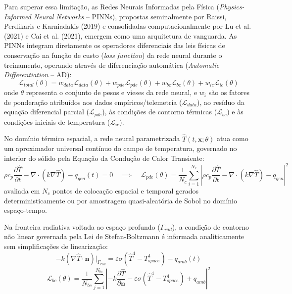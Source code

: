 Para superar essa limitação, as Redes Neurais Informadas pela Física (\textit{Physics-Informed Neural Networks} -- PINNs), propostas seminalmente por Raissi, Perdikaris e Karniadakis (2019) e consolidadas computacionalmente por Lu et al. (2021) e Cai et al. (2021), emergem como uma arquitetura de vanguarda. As PINNs integram diretamente os operadores diferenciais das leis físicas de conservação na função de custo (\textit{loss function}) da rede neural durante o treinamento, operando através de diferenciação automática (\textit{Automatic Differentiation} -- AD):
\begin{equation}
    \mathcal{L}_{total}(\theta) = w_{data}\mathcal{L}_{data}(\theta) + w_{pde}\mathcal{L}_{pde}(\theta) + w_{bc}\mathcal{L}_{bc}(\theta) + w_{ic}\mathcal{L}_{ic}(\theta)
    \label{eq:pinn_loss_geral}
\end{equation}
onde $\theta$ representa o conjunto de pesos e vieses da rede neural, e $w_i$ são os fatores de ponderação atribuídos aos dados empíricos/telemetria ($\mathcal{L}_{data}$), ao resíduo da equação diferencial parcial ($\mathcal{L}_{pde}$), às condições de contorno térmicas ($\mathcal{L}_{bc}$) e às condições iniciais de temperatura ($\mathcal{L}_{ic}$).

No domínio térmico espacial, a rede neural parametrizada $\hat{T}(t, \mathbf{x}; \theta)$ atua como um aproximador universal contínuo do campo de temperatura, governado no interior do sólido pela Equação da Condução de Calor Transiente:
\begin{equation}
    \rho c_p \frac{\partial \hat{T}}{\partial t} - \nabla \cdot \left( k \nabla \hat{T} \right) - q_{gen}(t) = 0 \quad \implies \quad \mathcal{L}_{pde}(\theta) = \frac{1}{N_{c}} \sum_{i=1}^{N_{c}} \left| \rho c_p \frac{\partial \hat{T}}{\partial t} - \nabla \cdot (k \nabla \hat{T}) - q_{gen} \right|^2
    \label{eq:pde_calor_pinn}
\end{equation}
avaliada em $N_c$ pontos de colocação espacial e temporal gerados deterministicamente ou por amostragem quasi-aleatória de Sobol no domínio espaço-tempo.

Na fronteira radiativa voltada ao espaço profundo ($\Gamma_{rad}$), a condição de contorno não linear governada pela Lei de Stefan-Boltzmann é informada analiticamente sem simplificações de linearização:
\begin{equation}
    -k \left( \nabla \hat{T} \cdot \mathbf{n} \right)\Big|_{\Gamma_{rad}} = \varepsilon \sigma \left( \hat{T}^4 - T_{space}^4 \right) - q_{amb}(t)
    \label{eq:bc_rad_pinn}
\end{equation}
\begin{equation}
    \mathcal{L}_{bc}(\theta) = \frac{1}{N_{bc}} \sum_{j=1}^{N_{bc}} \left| -k \frac{\partial \hat{T}}{\partial \mathbf{n}} - \varepsilon \sigma \left( \hat{T}^4 - T_{space}^4 \right) + q_{amb} \right|^2
    \label{eq:loss_bc_rad}
\end{equation}

